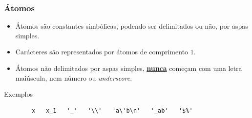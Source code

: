 
\begin{frame}[fragile]
	\frametitle{Átomos}
	
	\begin{itemize}
	  \item Átomos são constantes simbólicas, podendo ser delimitados ou não, por 
	aspas simples.
	
	\item Carácteres são representados por átomos de comprimento $1$.
	
	 	\item Átomos não delimitados por aspas simples, \underline{\textbf{nunca}} começam com uma letra maiúscula, nem número ou \textit{underscore}.

	\end{itemize} 

	  \pause 
	\begin{exampleblock}{Exemplos}
		\begin{verbatim}
		x   x_1   '_'   '\\'   'a\'b\n'   '_ab'   '$%'
		\end{verbatim}
	\end{exampleblock}
	
\end{frame}


